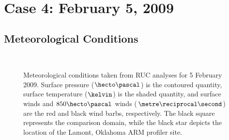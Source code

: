 \section{Case 4: February 5, 2009}
\label{feb5-46}

\subsection{Meteorological Conditions}
\label{mc-461}


\begin{figure}[H]
     \begin{center}
%
        \\ %
%
    \end{center}
    \caption{%
        Meteorological conditions taken from RUC analyses for 5 February 2009. Surface pressure ($\hecto\pascal$) is the contoured quantity, surface temperature ($\kelvin$) is the shaded quantity, and surface winds and $850\hecto\pascal$ winds ($\metre\reciprocal\second$) are the red and black wind barbs, respectively. The black square represents the comparison domain, while the black star depicts the location of the Lamont, Oklahoma ARM profiler site.}%
   \label{figure426}
\end{figure}


